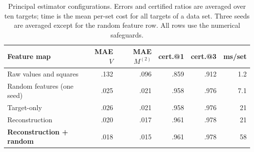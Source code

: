 \begin{table}[!tb]
\centering\small
\caption{Principal estimator configurations. Errors and certified ratios are averaged over ten targets; time is the mean per-set cost for all targets of a data set. Three seeds are averaged except for the random feature row. All rows use the numerical safeguards.}\label{tab:design-main}
\setlength{\tabcolsep}{5pt}
\begin{tabular}{lrrrrr}
\toprule
Feature map & MAE $V$ & MAE $M^{(2)}$ & cert.@1 & cert.@3 & ms/set\\
\midrule
Raw values and squares & .132 & .096 & .859 & .912 & 1.2\\
Random features (one seed) & .025 & .021 & .958 & .976 & 7.1\\
Target-only & .026 & .021 & .958 & .976 & 21\\
Reconstruction & .020 & .017 & .961 & .978 & 21\\
\textbf{Reconstruction + random} & .018 & .015 & .961 & .978 & 58\\
\bottomrule
\end{tabular}
\end{table}
